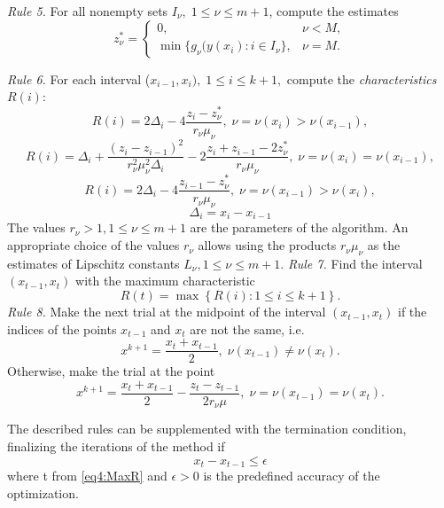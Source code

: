 \documentclass[graybox]{svmult}
\begin{document}
\emph{Rule 5.} For all nonempty sets $I_\nu, \; 1 \leq \nu \leq m+1$, compute the estimates
\begin{equation}
  z_\nu^\ast = \left\{
  \begin{array}{lr}
    0, & \nu < M,\\
    \min\{ g_\nu(y(x_i): i\in I_\nu \}, & \nu = M.
  \end{array}
  \right.
\end{equation}

\emph{Rule 6.} For each interval ($x_{i-1},x_i), \; 1 \leq i \leq k+1,$ compute the \textit{characteristics} $R(i)$:
\[
R(i)=2\Delta_i-4\frac{z_i-z_\nu^\ast}{r_\nu \mu_\nu}, \; \nu=\nu(x_i)>\nu(x_{i-1}),
\]
\begin{equation}
\label{eq4:characteristic}
R(i)=\Delta_i+\frac{(z_i-z_{i-1})^2}{r_\nu^2 \mu_\nu^2\Delta_i}-2\frac{z_i+z_{i-1}-2z_\nu^\ast}{r_\nu \mu_\nu}, \;  \nu=\nu(x_i)=\nu(x_{i-1}),
\end{equation}
\[
R(i)=2\Delta_i-4\frac{z_{i-1}-z_\nu^\ast}{r_\nu \mu_\nu}, \; \nu=\nu(x_{i-1})>\nu(x_i),
\]
\[
\Delta_i=x_i - x_{i-1}
\]
The values $r_\nu>1, 1\le\nu\le m+1$ are the parameters of the algorithm. An appropriate choice of the values $r_\nu$ allows using the products $r_\nu\mu_\nu$ as the estimates of Lipschitz constants $L_\nu, 1\le\nu\le m+1$.
\emph{Rule 7.} Find the interval $(x_{t-1},x_t)$ with the maximum characteristic
\begin{equation}
\label{eq4:MaxR}
R(t)=\max{\left\{R(i): 1 \leq i \leq k+1\right\}}.
\end{equation}
\emph{Rule 8.} Make the next trial at the midpoint of the interval
$(x_{t-1},x_t)$ if the indices of the points $x_{t-1}$ and $x_t$  are not the same, i.e.
\[
x^{k+1} = \frac{x_t + x_{t-1}}{2}, \; \nu(x_{t-1}) \neq \nu(x_t).
\]
Otherwise, make the trial at the point
\begin{equation}
\label{eq4:next_point}
x^{k+1} = \frac{x_t+x_{t-1}}{2} - \frac{z_t-z_{t-1}}{2r_\nu\mu},\; \nu=\nu(x_{t-1})=\nu(x_t).
\end{equation}

The described rules can be supplemented with the termination condition, finalizing the iterations of the method if
\begin{equation}
\label{eq4:stop_cond}
  x_t - x_{t-1}\le\epsilon
\end{equation}
where t from \eqref{eq4:MaxR} and $\epsilon>0$ is the predefined accuracy of the optimization.
\end{document}
